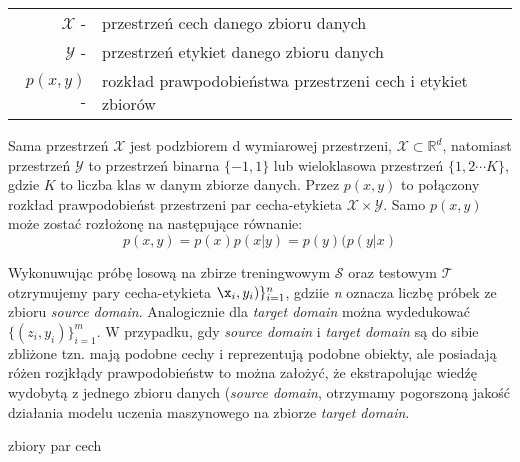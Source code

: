             \begin{tabular}{rl}
                $\mathcal{X}$ -& przestrzeń cech danego zbioru danych \\
                $\mathcal{Y}$ -& przestrzeń etykiet danego zbioru danych \\
                $p(x,y)$ -& rozkład prawpodobieństwa przestrzeni cech i etykiet zbiorów
            \end{tabular}
            \linebreak
            
            Sama przestrzeń $\mathcal{X}$ jest podzbiorem d wymiarowej przestrzeni, $\mathcal{X} \subset \mathbb{R}^{d}$, natomiast przestrzeń $\mathcal{Y}$ to przestrzeń binarna $\{ -1, 1\}$ lub wieloklasowa przestrzeń $\{1,2\cdots K \}$, gdzie $K$ to liczba klas w danym zbiorze danych. Przez $p(x,y)$ to połączony rozkład prawpodobieńst przestrzeni par cecha-etykieta $\mathcal{X} \times \mathcal{Y}$. Samo $p(x,y)$ może zostać rozłożonę na następujące równanie:
            \begin{equation*}
                p(x,y) = p(x)p(x|y) = p(y)(p(y|x)
            \end{equation*}
            \par
            Wykonuwując próbę losową na zbirze treningwowym $\mathcal{S}$ oraz testowym $\mathcal{T}$ otzrymujemy pary cecha-etykieta
            $\x_i, y_i)\}^{n}_{i=1}$, gdziie \textit{n} oznacza liczbę próbek ze zbioru \textit{source domain}. Analogicznie dla \textit{target domain} można wydedukować $\{(z_i, y_i)\}^{m}_{i=1}$. W przypadku, gdy \textit{source domain} i \textit{target domain} są do sibie zbliżone tzn. mają podobne cechy i reprezentują podobne obiekty, ale posiadają różen rozjkłądy prawpodobieństw to można założyć, że ekstrapolując wiedźę wydobytą z jednego zbioru danych (\textit{source domain}, otrzymamy pogorszoną jakość działania modelu uczenia maszynowego na zbiorze \textit{target domain}.
            
            zbiory par cech

